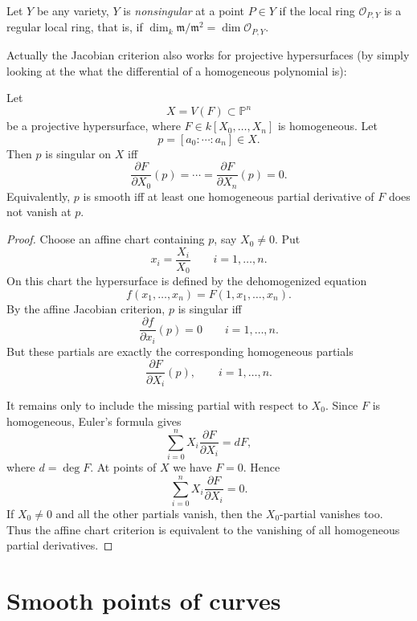 \begin{definition}
\label{definition-nonsingular}
Let $Y$ be any variety,
$Y$ is {\it nonsingular} at a point $P \in Y$
if the local ring $\mathcal{O}_{P,Y}$ is a
regular local ring,
that is,
if $\dim_k\mathfrak{m}/\mathfrak{m}^2=\dim
\mathcal{O}_{P,Y}$.
\end{definition}

\noindent
Actually the Jacobian criterion
also works for projective hypersurfaces
(by simply looking at the what the
differential of a homogeneous polynomial is):

\begin{lemma}
\label{lemma-projective-jacobian}
Let
$$
  X=V(F)\subset \mathbb P^n
$$
be a projective hypersurface, where
$F\in k[X_0,\ldots,X_n]$ is homogeneous.
Let
$$
  p=[a_0:\cdots:a_n]\in X.
$$
Then $p$ is singular on $X$ iff
$$
  \frac{\partial F}{\partial X_0}(p)
  =
  \cdots
  =
  \frac{\partial F}{\partial X_n}(p)
  =
  0.
$$
Equivalently, $p$ is smooth iff at least
one homogeneous partial derivative of
$F$ does not vanish at $p$.
\end{lemma}

\begin{proof}
Choose an affine chart containing $p$,
say $X_0\neq 0$. Put
$$
  x_i=\frac{X_i}{X_0}
  \qquad
  i=1,\ldots,n.
$$
On this chart the hypersurface is defined
by the dehomogenized equation
$$
  f(x_1,\ldots,x_n)
  =
  F(1,x_1,\ldots,x_n).
$$
By the affine Jacobian criterion, $p$ is
singular iff
$$
  \frac{\partial f}{\partial x_i}(p)=0
  \qquad
  i=1,\ldots,n.
$$
But these partials are exactly the
corresponding homogeneous partials
$$
  \frac{\partial F}{\partial X_i}(p),
  \qquad
  i=1,\ldots,n.
$$

It remains only to include the missing
partial with respect to $X_0$. Since $F$
is homogeneous, Euler's formula gives
$$
  \sum_{i=0}^n
  X_i\frac{\partial F}{\partial X_i}
  =
  dF,
$$
where $d=\deg F$. At points of $X$ we
have $F=0$. Hence
$$
  \sum_{i=0}^n
  X_i\frac{\partial F}{\partial X_i}
  =
  0.
$$
If $X_0\neq 0$ and all the other partials
vanish, then the $X_0$-partial vanishes
too. Thus the affine chart criterion is
equivalent to the vanishing of all
homogeneous partial derivatives.
\end{proof}


\section{Smooth points of curves}
\label{section-smooth-points-curves}

